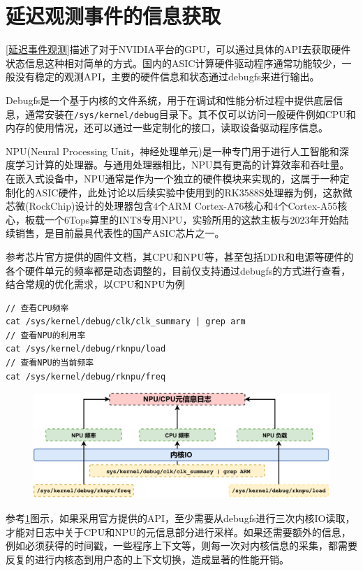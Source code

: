 \documentclass[master,anonymous]{shtthesis}
\begin{document}
\section{延迟观测事件的信息获取}\label{延迟观测事件的信息获取}
\ref{延迟事件观测}描述了对于NVIDIA平台的GPU，可以通过具体的API去获取硬件状态信息这种相对简单的方式。国内的ASIC计算硬件驱动程序通常功能较少，一般没有稳定的观测API，主要的硬件信息和状态通过debugfs来进行输出。

Debugfs是一个基于内核的文件系统，用于在调试和性能分析过程中提供底层信息，通常安装在\verb*|/sys/kernel/debug|目录下。其不仅可以访问一般硬件例如CPU和内存的使用情况，还可以通过一些定制化的接口，读取设备驱动程序信息。

NPU(Neural Processing Unit，神经处理单元)是一种专门用于进行人工智能和深度学习计算的处理器。与通用处理器相比，NPU具有更高的计算效率和吞吐量。在嵌入式设备中，NPU通常是作为一个独立的硬件模块来实现的，这属于一种定制化的ASIC硬件，此处讨论以后续实验中使用到的RK3588S处理器为例，这款微芯微(RockChip)设计的处理器包含4个ARM Cortex-A76核心和4个Cortex-A55核心，板载一个6Tops算里的INT8专用NPU，实验所用的这款主板与2023年开始陆续销售，是目前最具代表性的国产ASIC芯片之一。

参考芯片官方提供的固件文档，其CPU和NPU等，甚至包括DDR和电源等硬件的各个硬件单元的频率都是动态调整的，目前仅支持通过debugfs的方式进行查看，结合常规的优化需求，以CPU和NPU为例
\begin{lstlisting}[caption={命令行查看rk3588硬件参数信息},captionpos=b]
// 查看CPU频率
cat /sys/kernel/debug/clk/clk_summary | grep arm 
// 查看NPU的利用率
cat /sys/kernel/debug/rknpu/load 
// 查看NPU的当前频率
cat /sys/kernel/debug/rknpu/freq 
\end{lstlisting}


\begin{figure}[htbp]
	\centering
	\includegraphics[width=12cm]{img/readk.pdf}
	\label{读取上述硬件信息需要的内核IO}
\end{figure}
参考\ref{读取上述硬件信息需要的内核IO}图示，如果采用官方提供的API，至少需要从debugfs进行三次内核IO读取，才能对日志中关于CPU和NPU的元信息部分进行采样。如果还需要额外的信息，例如必须获得的时间戳，一些程序上下文等，则每一次对内核信息的采集，都需要反复的进行内核态到用户态的上下文切换，造成显著的性能开销。
\end{document}
